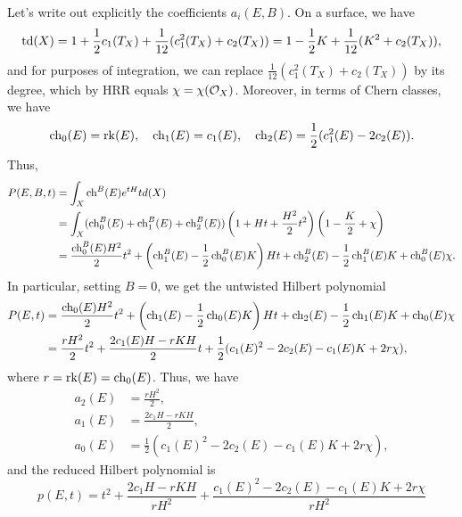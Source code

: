 \documentclass[letterpaper,10pt]{article}
\begin{document}
Let's write out explicitly the coefficients $a_i(E, B)$. On a surface, we have
\[ \operatorname{\mathrm{td}}(X) = 1 + \frac{1}{2} c_1(T_X) + \frac{1}{12}(c_1^2(T_X) + c_2(T_X)) = 1 - \frac{1}{2} K + \frac{1}{12}(K^2 + c_2(T_X)), \]
and for purposes of integration, we can replace $\frac{1}{12}(c_1^2(T_X) + c_2(T_X))$ by its degree, which by HRR equals $\chi = \chi(\mathcal{O}_X)$. Moreover, in terms of Chern classes, we have
\[ \operatorname{\mathrm{ch}}_0(E) = \operatorname{\mathrm{rk}}(E), \quad \operatorname{\mathrm{ch}}_1(E) = c_1(E), \quad \operatorname{\mathrm{ch}}_2(E) = \frac{1}{2}(c_1^2(E) - 2 c_2(E)). \]
Thus, 
\begin{align*}
    P(E, B, t) & = \int_X \operatorname{\mathrm{ch}}^B(E) e^{t H} td(X) \\
    & = \int_X(\operatorname{\mathrm{ch}}_0^B(E) + \operatorname{\mathrm{ch}}_1^B(E) + \operatorname{\mathrm{ch}}_2^B(E))\left(1 + H t + \frac{H^2}{2} t^2\right)\left(1 - \frac{K}{2} + \chi\right) \\
    & = \frac{\operatorname{\mathrm{ch}}_0^B(E) H^2}{2} t^2 + \left(\operatorname{\mathrm{ch}}_1^B(E) - \frac{1}{2}\operatorname{\mathrm{ch}}_0^B(E) K\right) H t + \operatorname{\mathrm{ch}}_2^B(E) - \frac{1}{2} \operatorname{\mathrm{ch}}_1^B(E) K + \operatorname{\mathrm{ch}}_0^B(E) \chi. \\
\end{align*}
In particular, setting $B = 0$, we get the untwisted Hilbert polynomial
\begin{align*}
    P(E, t) & = \frac{\operatorname{\mathrm{ch}}_0(E) H^2}{2} t^2 + \left(\operatorname{\mathrm{ch}}_1(E) - \frac{1}{2}\operatorname{\mathrm{ch}}_0(E) K\right) H t + \operatorname{\mathrm{ch}}_2(E) - \frac{1}{2} \operatorname{\mathrm{ch}}_1(E) K + \operatorname{\mathrm{ch}}_0(E) \chi \\
    & = \frac{r H^2}{2} t^2 + \frac{2 c_1(E) H - r K H}{2} t + \frac{1}{2}(c_1(E)^2 - 2 c_2(E) - c_1(E) K + 2 r \chi),
\end{align*}
where $r = \operatorname{\mathrm{rk}}(E) = \operatorname{\mathrm{ch}}_0(E)$. Thus, we have
\begin{align*}
    a_2(E) & = \frac{r H^2}{2}, \\
    a_1(E) & = \frac{2 c_1 H - r K H}{2}, \\
    a_0(E) & = \frac{1}{2}(c_1(E)^2 - 2 c_2(E) - c_1(E) K + 2 r \chi),
\end{align*}
and the reduced Hilbert polynomial is
\[ p(E, t) = t^2 + \frac{2 c_1 H - r K H}{r H^2} + \frac{c_1(E)^2 - 2 c_2(E) - c_1(E) K + 2 r \chi}{r H^2} \]
\end{document}
